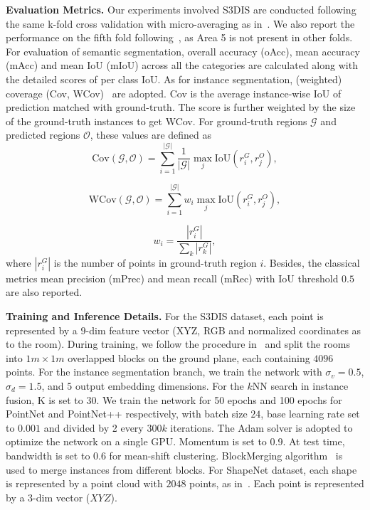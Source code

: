 \documentclass[10pt,twocolumn,letterpaper]{article}
\newcommand{\myparagraph}[1]{{\vspace{0.5em} \noindent \bf #1}}
\begin{document}
\myparagraph{Evaluation Metrics.}
Our experiments involved S3DIS are conducted following the same k-fold cross validation with micro-averaging as in~\cite{Qi_2017_CVPR}. 
We also report the performance on the fifth fold following~\cite{tchapmi2017segcloud}, as Area 5 is not present in other folds. 
For evaluation of semantic segmentation, overall accuracy (oAcc), mean accuracy (mAcc) and mean IoU (mIoU) across all the categories are calculated along with the detailed scores of per class IoU.
As for instance segmentation, (weighted) coverage (Cov, WCov)~\cite{ren17recattend, SGN17,zhuo2017indoor} are adopted.
Cov is the average instance-wise IoU of prediction matched with ground-truth. 
The score is further weighted by the size of the ground-truth instances to get WCov.
For ground-truth regions $\mathcal{G}$ and predicted regions $\mathcal{O}$, these values are defined as 
\begin{equation}
    \textrm{Cov}(\mathcal{G}, \mathcal{O}) = \sum_{i=1}^{|\mathcal{G}|}\frac{1}{|\mathcal{G}|}  \max_{j} \textrm{IoU}(r_{i}^{G}, r_{j}^{O}),
\end{equation}

\begin{equation}
    \textrm{WCov}(\mathcal{G}, \mathcal{O}) = \sum_{i=1}^{|\mathcal{G}|}w_{i}  \max_{j} \textrm{IoU}(r_{i}^{G}, r_{j}^{O}),
\end{equation}

\begin{equation}
     w_{i} = \frac{|r_{i}^{G}|}{\sum_k |r_{k}^{G}|},
\end{equation}
where $|r_i^G|$ is the number of points in ground-truth region $i$.
Besides, the classical metrics mean precision (mPrec) and mean recall (mRec) with IoU threshold $0.5$ are also reported. 

\myparagraph{Training and Inference Details.}
For the S3DIS dataset, each point is represented by a $9$-dim feature vector (XYZ, RGB and normalized coordinates as to the room).
During training, we follow the procedure in~\cite{Qi_2017_CVPR} and split the rooms into $1m \times 1m$ overlapped blocks on the ground plane, each containing $4096$ points.
For the instance segmentation branch, we train the network with ${\sigma}_v = 0.5$, ${\sigma}_d = 1.5$, and $5$ output embedding dimensions. 
For the $k$NN search in instance fusion, K is set to $30$.
We train the network for 50 epochs and 100 epochs for PointNet and PointNet++ respectively, with batch size $24$, base learning rate set to $0.001$ and divided by 2 every $300k$ iterations. 
The Adam solver is adopted to optimize the network on a single GPU.
Momentum is set to 0.9.
At test time, bandwidth is set to $0.6$ for mean-shift clustering.
BlockMerging algorithm~\cite{sgpn} is used to merge instances from different blocks.
For ShapeNet dataset, each shape is represented by a point cloud with $2048$ points, as in~\cite{Qi_2017_CVPR}. Each point is represented by a $3$-dim vector ($XYZ$).
\end{document}
